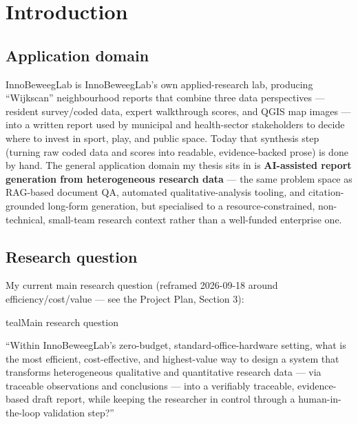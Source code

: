 \section{Introduction}\label{sec:intro}

\subsection{Application domain}\label{sec:domain}

InnoBeweegLab is InnoBeweegLab's own applied-research lab, producing \textquotedblleft{}Wijkscan\textquotedblright{} neighbourhood reports that combine three data perspectives — resident survey/coded data, expert walkthrough scores, and QGIS map images — into a written report used by municipal and health-sector stakeholders to decide where to invest in sport, play, and public space. Today that synthesis step (turning raw coded data and scores into readable, evidence-backed prose) is done by hand. The general application domain my thesis sits in is \textbf{AI-assisted report generation from heterogeneous research data} — the same problem space as RAG-based document QA, automated qualitative-analysis tooling, and citation-grounded long-form generation, but specialised to a resource-constrained, non-technical, small-team research context rather than a well-funded enterprise one.



\subsection{Research question}\label{sec:rq}

My current main research question (reframed 2026-09-18 around efficiency/cost/value — see the Project Plan, Section 3):



\begin{calloutbox}{teal}{Main research question}

\textquotedblleft{}Within InnoBeweegLab's zero-budget, standard-office-hardware setting, what is the most efficient, cost-effective, and highest-value way to design a system that transforms heterogeneous qualitative and quantitative research data — via traceable observations and conclusions — into a verifiably traceable, evidence-based draft report, while keeping the researcher in control through a human-in-the-loop validation step?\textquotedblright{}

\end{calloutbox}

